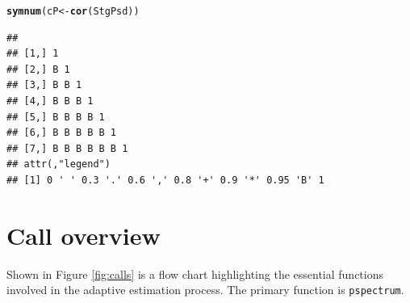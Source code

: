 \documentclass{article}\usepackage{graphicx, color}
\makeatletter
\newcommand{\hlfunctioncall}[1]{\textcolor[rgb]{0.501960784313725,0,0.329411764705882}{\textbf{#1}}}%
\newenvironment{kframe}{%
 \def\at@end@of@kframe{}%
 \ifinner\ifhmode%
  \def\at@end@of@kframe{\end{minipage}}%
  \begin{minipage}{\columnwidth}%
 \fi\fi%
 \def\FrameCommand##1{\hskip\@totalleftmargin \hskip-\fboxsep
 \colorbox{shadecolor}{##1}\hskip-\fboxsep
     \hskip-\linewidth \hskip-\@totalleftmargin \hskip\columnwidth}%
 \MakeFramed {\advance\hsize-\width
   \@totalleftmargin\z@ \linewidth\hsize
   \@setminipage}}%
 {\par\unskip\endMakeFramed%
 \at@end@of@kframe}
\newenvironment{knitrout}{}{} %
\newcommand{\Rcmd}[1]{\texttt{#1}}
\makeatother
\begin{document}
\begin{knitrout}
\color{fgcolor}\begin{kframe}
\begin{alltt}
\hlfunctioncall{symnum}(cP <- \hlfunctioncall{cor}(StgPsd))
\end{alltt}
\begin{verbatim}
##                   
## [1,] 1            
## [2,] B 1          
## [3,] B B 1        
## [4,] B B B 1      
## [5,] B B B B 1    
## [6,] B B B B B 1  
## [7,] B B B B B B 1
## attr(,"legend")
## [1] 0 ' ' 0.3 '.' 0.6 ',' 0.8 '+' 0.9 '*' 0.95 'B' 1
\end{verbatim}
\end{kframe}
\end{knitrout}



\section{Call overview}

Shown
in Figure \ref{fig:calls}
is a flow chart 
highlighting the essential
functions involved in the adaptive estimation
process. The primary function is \Rcmd{pspectrum}.
\end{document}
